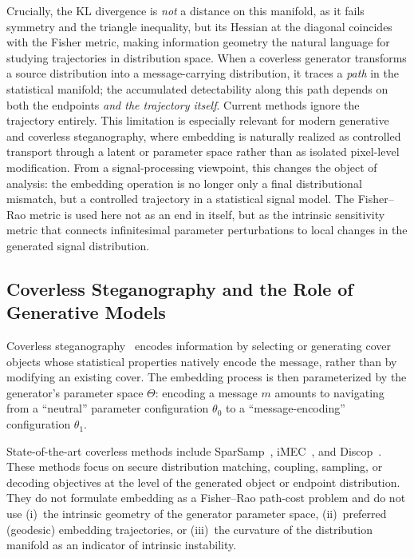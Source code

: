 \documentclass[a4paper,fleqn]{cas-dc}
\begin{document}
Crucially, the KL divergence is \emph{not} a distance on this manifold, as it
fails symmetry and the triangle inequality, but its Hessian at the diagonal
coincides with the Fisher metric, making information geometry the natural
language for studying trajectories in distribution space.
When a coverless generator transforms a source distribution into a
message-carrying distribution, it traces a \emph{path} in the statistical
manifold; the accumulated detectability along this path depends on both the
endpoints \emph{and the trajectory itself}.
Current methods ignore the trajectory entirely.
This limitation is especially relevant for modern generative and coverless
steganography, where embedding is naturally realized as controlled transport
through a latent or parameter space rather than as isolated pixel-level
modification.
From a signal-processing viewpoint, this changes the object of analysis:
the embedding operation is no longer only a final distributional mismatch, but
a controlled trajectory in a statistical signal model. The Fisher--Rao metric is
used here not as an end in itself, but as the intrinsic sensitivity metric that
connects infinitesimal parameter perturbations to local changes in the generated
signal distribution.

\subsection{Coverless Steganography and the Role of Generative Models}

Coverless steganography~\cite{luo2023coverless} encodes information by
selecting or generating cover objects whose statistical properties natively
encode the message, rather than by modifying an existing cover.
The embedding process is then parameterized by the generator's parameter
space $\Theta$: encoding a message $m$ amounts to navigating from a
``neutral'' parameter configuration $\theta_0$ to a
``message-encoding'' configuration $\theta_1$.

State-of-the-art coverless methods include SparSamp~\cite{sparsamp2021},
iMEC~\cite{imec2022}, and Discop~\cite{discop2023}.
These methods focus on secure distribution matching, coupling, sampling, or
decoding objectives at the level of the generated object or endpoint
distribution.
They do not formulate embedding as a Fisher--Rao path-cost problem and do not
use (i)~the intrinsic geometry of the generator parameter space, (ii)~preferred
(geodesic) embedding trajectories, or (iii)~the curvature of the distribution
manifold as an indicator of intrinsic instability.
\end{document}
